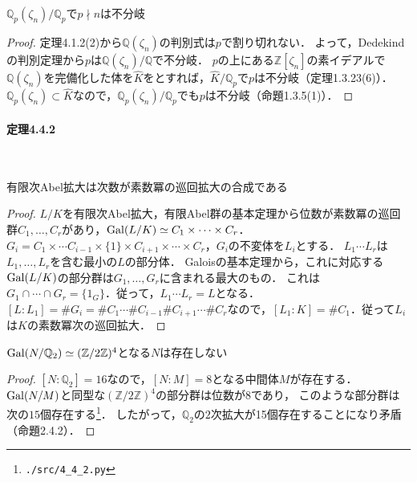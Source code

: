 \begin{screen}
  $\mathbb{Q}_p(\zeta_{n})/\mathbb{Q}_p$で$p\nmid n$は不分岐
\end{screen}
\begin{proof}
  定理4.1.2(2)から$\mathbb{Q}(\zeta_{n})$の判別式は$p$で割り切れない．
  よって，Dedekindの判別定理から$p$は$\mathbb{Q}(\zeta_{n})/\mathbb{Q}$で不分岐．
  $p$の上にある$\mathbb{Z}[\zeta_n]$の素イデアルで$\mathbb{Q}(\zeta_n)$を完備化した体を$\widehat{K}$をとすれば，$\widehat{K}/\mathbb{Q}_p$で$p$は不分岐（定理1.3.23(6)）．
  $\mathbb{Q}_p(\zeta_n)\subset\widehat{K}$なので，$\mathbb{Q}_p(\zeta_n)/\mathbb{Q}_p$でも$p$は不分岐（命題1.3.5(1)）．
\end{proof}

\paragraph{定理4.4.2}~
\begin{screen}
  有限次Abel拡大は次数が素数冪の巡回拡大の合成である
\end{screen}
\begin{proof}
  $L/K$を有限次Abel拡大，有限Abel群の基本定理から位数が素数冪の巡回群$C_1,\ldots,C_r$があり，$\operatorname{Gal}(L/K)\simeq C_1\times\cdots\times C_r$．
  $G_i=C_1\times\cdots C_{i-1}\times\{1\}\times C_{i+1}\times\cdots\times C_r$，$G_i$の不変体を$L_i$とする．
  $L_1\cdots L_r$は$L_1,\ldots,L_r$を含む最小の$L$の部分体．
  Galoisの基本定理から，これに対応する$\operatorname{Gal}(L/K)$の部分群は$G_1,\ldots,G_r$に含まれる最大のもの．
  これは$G_1\cap\cdots\cap G_r=\{1_G\}$．従って，$L_1\cdots L_r=L$となる．
  $[L:L_1]=\# G_i=\# C_1\cdots \#C_{i-1}\# C_{i+1}\cdots\# C_r$なので，$[L_1:K]=\# C_1$．従って$L_i$は$K$の素数冪次の巡回拡大．
\end{proof}

\begin{screen}
  $\operatorname{Gal}(N/\mathbb{Q}_2)\simeq(\mathbb{Z}/2\mathbb{Z})^4$となる$N$は存在しない
\end{screen}
\begin{proof}
  $[N:\mathbb{Q}_2]=16$なので，$[N:M]=8$となる中間体$M$が存在する．
  $\operatorname{Gal}(N/M)$と同型な$(\mathbb{Z}/2\mathbb{Z})^4$の部分群は位数が$8$であり，
  このような部分群は次の$15$個存在する\footnote{\verb|./src/4_4_2.py|}．
  したがって，$\mathbb{Q}_2$の$2$次拡大が15個存在することになり矛盾（命題2.4.2）．
\end{proof}

